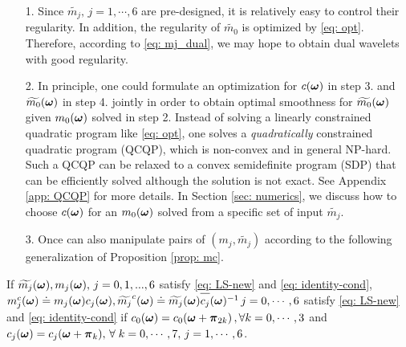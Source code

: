 \begin{itemize}
\item[1.] Since $\widetilde{m_j},\, j=1,\cdots,6$ are pre-designed, it is relatively easy to control their regularity. In addition, the regularity of $\widetilde{m_0}$ is optimized by \eqref{eq: opt}. Therefore, according to \eqref{eq: mj_dual}, we may hope to obtain dual wavelets with good regularity.
\item[2.] In principle, one could formulate an optimization for $c(\boldsymbol{\omega})$ in step 3. and $\widetilde{m_{0}}(\boldsymbol{\omega})$ in step 4. jointly in order to obtain optimal smoothness for $\widetilde{m_{0}}(\boldsymbol{\omega})$ given $m_0(\boldsymbol{\omega})$ solved in step 2. Instead of solving a linearly constrained quadratic program like \eqref{eq: opt}, one solves a {\it quadratically} constrained quadratic program (QCQP), which is non-convex and in general NP-hard. Such a QCQP can be relaxed to a convex semidefinite program (SDP) that can be efficiently solved although the solution is not exact. See Appendix \ref{app: QCQP} for more details. In Section \ref{sec: numerics}, we discuss how to choose $c(\boldsymbol{\omega})$ for an $m_0(\boldsymbol{\omega})$ solved from a specific set of input $\widetilde{m_j}$.
\item[3.] Once can also manipulate pairs of $(m_j,\widetilde{m_j})$ according to the following generalization of Proposition \ref{prop: mc}.
\end{itemize}
\begin{proposition}\label{prop: mjc}
If $\widetilde{m_{j}}(\boldsymbol{\omega}), m_j(\boldsymbol{\omega}),\,  j = 0,1,...,6$ satisfy \eqref{eq: LS-new} and \eqref{eq: identity-cond}, 
$m_j^c(\V{\omega})\doteq m_j(\V{\omega})c_j(\V{\omega}), \widetilde{m_j}^c(\V{\omega})\doteq \m{j}\overlinespace{c_j}(\V{\omega})^{-1} \, j = 0,\cdots,6$ 
satisfy \eqref{eq: LS-new} and \eqref{eq: identity-cond} if $ c_0(\boldsymbol{\omega}) = c_0(\boldsymbol{\omega}+\boldsymbol{\pi}_{2k})\,,\forall k = 0,\cdots,3$ and $c_j(\boldsymbol{\omega}) = c_j(\boldsymbol{\omega} + \boldsymbol{\pi}_k),\, \forall \;k = 0,\cdots,7,\, j = 1,\cdots,6$.
\end{proposition}


